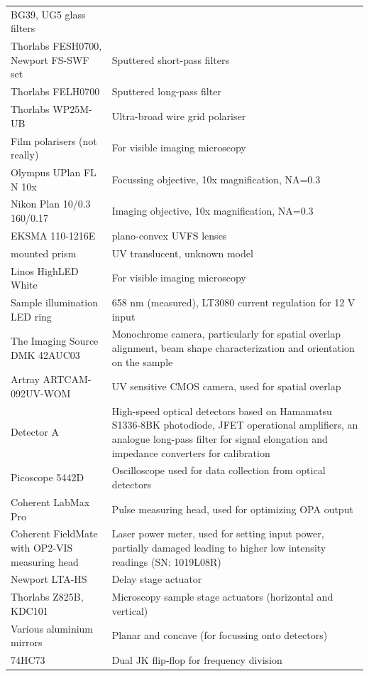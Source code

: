 \documentclass[twoside,openright]{scrreprt}
\begin{document}
\begin{longtable}{p{}p{}}
    BG39, UG5 glass filters \\
    Thorlabs FESH0700, Newport FS-SWF set & Sputtered short-pass filters \\
    Thorlabs FELH0700 & Sputtered long-pass filter \\
    Thorlabs WP25M-UB & Ultra-broad wire grid polariser \\
    Film polarisers (not really) & For visible imaging microscopy \\
    Olympus UPlan FL N 10x & Focussing objective, 10x magnification, NA=0.3 \\
    Nikon Plan 10/0.3 160/0.17 & Imaging objective, 10x magnification, NA=0.3 \\
    EKSMA 110-1216E & plano-convex UVFS lenses\\
    mounted prism & UV translucent, unknown model\\
    Linos HighLED White & For visible imaging microscopy \\
    Sample illumination LED ring & 658 nm (measured), LT3080 current regulation for 12 V input \\
    The Imaging Source DMK 42AUC03 & Monochrome camera, particularly for spatial overlap alignment, beam shape characterization and orientation on the sample \\
    Artray ARTCAM-092UV-WOM & UV sensitive CMOS camera, used for spatial overlap\\
    Detector A & High-speed optical detectors based on Hamamatsu S1336-8BK photodiode, JFET operational amplifiers, an analogue  long-pass filter for signal elongation and impedance converters for calibration \\
    Picoscope 5442D & Oscilloscope used for data collection from optical detectors \\
    Coherent LabMax Pro & Pulse measuring head, used for optimizing OPA output \\
    Coherent FieldMate with OP2-VIS measuring head & Laser power meter, used for setting input power, partially damaged leading to higher low intensity readings (SN: 1019L08R) \\
    Newport LTA-HS & Delay stage actuator \\
    Thorlabs Z825B, KDC101 & Microscopy sample stage actuators (horizontal and vertical) \\
    Various aluminium mirrors & Planar and concave (for focussing onto detectors) \\
    74HC73 & Dual JK flip-flop for frequency division
\end{longtable}
\end{document}
